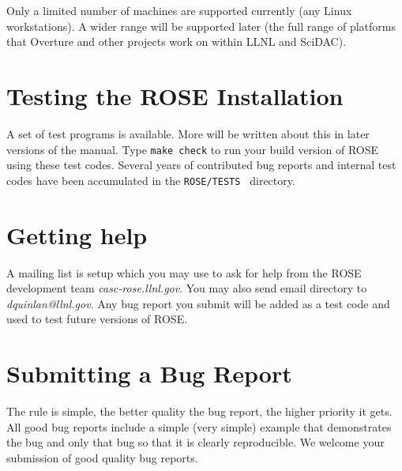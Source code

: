 Only a limited number of machines are supported currently (any Linux workstations).
A wider range will be supported later (the full range of platforms that Overture and other
projects work on within LLNL and SciDAC).

\section{Testing the ROSE Installation}
     A set of test programs is available.  More will be written about this
in later versions of the manual.  Type {\tt make check} to run your build version of ROSE
using these test codes.  Several years of contributed bug reports and internal test
codes have been accumulated in the {\tt ROSE/TESTS } directory.

\section{Getting help}
     A mailing list is setup which you may use to ask for help from the ROSE development 
team {\it casc-rose.llnl.gov}.  You may also send email directory to 
{\it dquinlan@llnl.gov}.  Any bug report you submit will be added as a test code and used
to test future versions of ROSE.

\section{Submitting a Bug Report}
     The rule is simple, the better quality the bug report, the higher priority it
gets.  All good bug reports include a simple (very simple) example that demonstrates
the bug and only that bug so that it is clearly reproducible.  We welcome your submission
of good quality bug reports.



